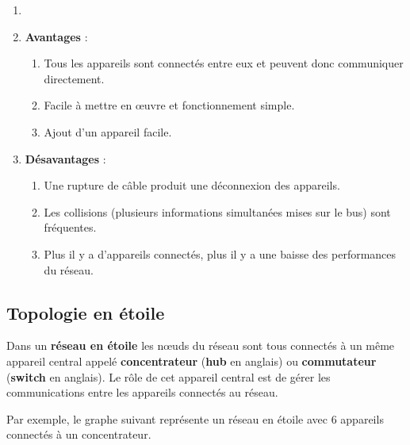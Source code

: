 \documentclass[11pt, a4paper]{book}
\begin{document}
\begin{remarques}
\begin{enumerate}
\item[]
\item {\bf Avantages} : 
	\begin{enumerate}
		\item Tous les appareils sont connectés entre eux et peuvent donc communiquer directement.
		\item  Facile à mettre en œuvre et fonctionnement simple.
		\item Ajout d'un appareil facile.\\
	\end{enumerate}
\item {\bf Désavantages} :
	\begin{enumerate}
		\item Une rupture de câble produit une déconnexion des appareils.
		\item Les collisions (plusieurs informations simultanées mises sur le bus) sont fréquentes.
		\item Plus il y a d'appareils connectés, plus il y a une baisse des performances du réseau.
	\end{enumerate}
\end{enumerate}
\end{remarques}












\subsection{Topologie en étoile}


\begin{defi}
Dans un {\bf réseau  en étoile} les nœuds du réseau sont tous connectés à un même appareil central appelé {\bf concentrateur} ({\bf hub} en anglais) ou {\bf commutateur} ({\bf switch} en anglais). Le rôle de cet appareil central est de gérer les communications entre les appareils connectés au réseau.
\end{defi}

Par exemple, le graphe suivant représente un réseau en étoile avec 6 appareils connectés à un concentrateur.
\end{document}
